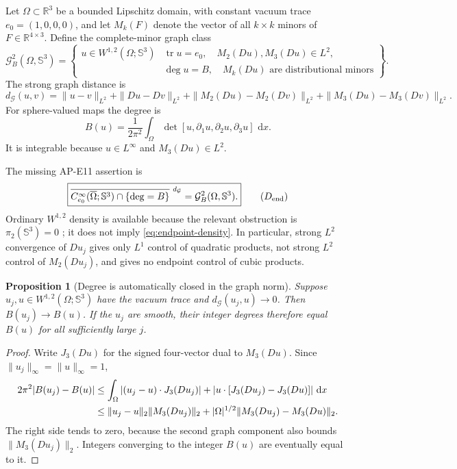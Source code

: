 \documentclass[11pt]{article}
\newtheorem{proposition}[theorem]{Proposition}
\newcommand{\dd}{\,\mathrm d}
\newcommand{\RR}{\mathbb R}
\newcommand{\SSS}{\mathbb S}
\newcommand{\GG}{\mathcal G}
\begin{document}
Let $\Omega\subset\RR^3$ be a bounded Lipschitz domain, with constant vacuum
trace $e_0=(1,0,0,0)$, and let $M_k(F)$ denote the vector of all $k\times k$
minors of $F\in\RR^{4\times3}$.  Define the complete-minor graph class
\begin{equation}
 \GG^2_B(\Omega,\SSS^3)=\left\{
 \begin{array}{l|l}
 u\in W^{1,2}(\Omega;\SSS^3)&
 \operatorname{tr}u=e_0,\quad M_2(Du),M_3(Du)\in L^2,\\[-2mm]
 &\deg u=B,\quad M_k(Du)\text{ are distributional minors}
 \end{array}\right\}.
 \label{eq:graph-class}
\end{equation}
The strong graph distance is
\begin{equation}
 d_{\GG}(u,v)=\|u-v\|_{L^2}+\|Du-Dv\|_{L^2}
 +\|M_2(Du)-M_2(Dv)\|_{L^2}
 +\|M_3(Du)-M_3(Dv)\|_{L^2}.
 \label{eq:graph-distance}
\end{equation}
For sphere-valued maps the degree is
\begin{equation}
 B(u)=\frac1{2\pi^2}\int_\Omega
 \det[u,\partial_1u,\partial_2u,\partial_3u]\,\dd x .
 \label{eq:degree}
\end{equation}
It is integrable because $u\in L^\infty$ and $M_3(Du)\in L^2$.

The missing AP-E11 assertion is
\begin{equation}
 \boxed{\overline{C^\infty_{e_0}(\overline\Omega;\SSS^3)
 \cap\{\deg=B\}}^{\ d_{\GG}}=\GG^2_B(\Omega,\SSS^3).}
 \qquad(D_{\rm end})\label{eq:endpoint-density}
\end{equation}
Ordinary $W^{1,2}$ density is available because the relevant obstruction is
$\pi_2(\SSS^3)=0$ \cite{Bethuel1991}; it does not imply
\eqref{eq:endpoint-density}.  In particular, strong $L^2$ convergence of
$Du_j$ gives only $L^1$ control of quadratic products, not strong $L^2$
control of $M_2(Du_j)$, and gives no endpoint control of cubic products.

\begin{proposition}[Degree is automatically closed in the graph norm]
Suppose $u_j,u\in W^{1,2}(\Omega;\SSS^3)$ have the vacuum trace and
$d_{\GG}(u_j,u)\to0$.  Then $B(u_j)\to B(u)$.  If the $u_j$ are smooth, their
integer degrees therefore equal $B(u)$ for all sufficiently large $j$.
\end{proposition}

\begin{proof}
Write $J_3(Du)$ for the signed four-vector dual to $M_3(Du)$.  Since
$\|u_j\|_\infty=\|u\|_\infty=1$,
\begin{align}
 2\pi^2|B(u_j)-B(u)|
 &\leq\int_\Omega |(u_j-u)\cdot J_3(Du_j)|
       +|u\cdot[J_3(Du_j)-J_3(Du)]|\,\dd x\notag\\
 &\leq \|u_j-u\|_2\|M_3(Du_j)\|_2
   +|\Omega|^{1/2}\|M_3(Du_j)-M_3(Du)\|_2.
 \label{eq:degree-continuity}
\end{align}
The right side tends to zero, because the second graph component also bounds
$\|M_3(Du_j)\|_2$.  Integers converging to the integer $B(u)$ are eventually
equal to it.
\end{proof}
\end{document}
